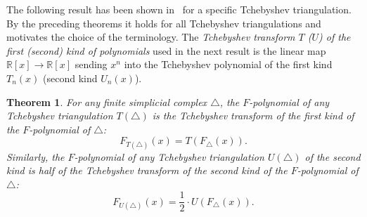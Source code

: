 \documentclass[reqno,12pt]{amsart}
\numberwithin{equation}{section}
\newtheorem{theorem}{Theorem}[section]
\newcommand{\0}{\widehat{0}}
\newcommand{\1}{\widehat{1}}
\newcommand{\2}{\widehat{2}}
\begin{document}
The following result has been shown in~\cite[Propositions 3.3 and
  4.4]{Hetyei-tt} for a specific Tchebyshev triangulation. By the
preceding theorems it holds for all Tchebyshev triangulations and
motivates the choice of the terminology. The {\em Tchebyshev transform
  $T$ ($U$) of the first (second) kind of polynomials} used in the
next result is  the linear map ${\mathbb 
  R}[x]\longrightarrow {\mathbb R}[x]$ sending $x^n$ into the Tchebyshev
polynomial of the first kind $T_n(x)$ (second kind $U_n(x)$).
\begin{theorem}
  \label{thm:tt}
For any finite simplicial complex $\triangle$, the $F$-polynomial of any
Tchebyshev triangulation $T(\triangle)$ is the Tchebyshev transform of
the first kind of the $F$-polynomial of $\triangle$:
$$
F_{T(\triangle)}(x)=T(F_{\triangle}(x)).
$$
Similarly, the $F$-polynomial of any Tchebyshev triangulation
$U(\triangle)$ of the second kind is half of the Tchebyshev transform of
the second kind of the $F$-polynomial of $\triangle$:
$$
F_{U(\triangle)}(x)=\frac{1}{2}\cdot U(F_{\triangle}(x)).
$$
\end{theorem}
\end{document}
